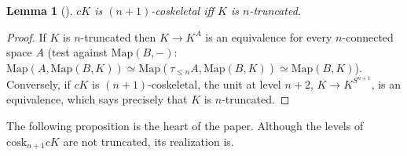 \documentclass[11pt]{amsart}
\newtheorem{lem}[thm]{Lemma}
\theoremstyle{definition}
\newcommand{\Map}{\mathrm{Map}}
\newcommand{\cosk}{\mathrm{cosk}}
\newcommand{\tr}[1]{\tau_{\le #1}}
\begin{document}
\begin{lem}[{\cite[Lemma~8.2]{Topjoin}}]\label{lem:constcosk}
$cK$ is $(n{+}1)$-coskeletal iff $K$ is $n$-truncated.
\end{lem}
\begin{proof}
If $K$ is $n$-truncated then $K\to K^A$ is an equivalence for every
$n$-connected space $A$ (test against $\Map(B,-)$: $\Map(A,\Map(B,K))\simeq
\Map(\tr nA,\Map(B,K))\simeq\Map(B,K)$). Conversely, if $cK$ is
$(n{+}1)$-coskeletal, the unit at level $n+2$, $K\to K^{S^{n+1}}$, is an
equivalence, which says precisely that $K$ is $n$-truncated.
\end{proof}

The following proposition is the heart of the paper. Although the levels of
$\cosk_{n+1}cK$ are not truncated, its realization is.
\end{document}
